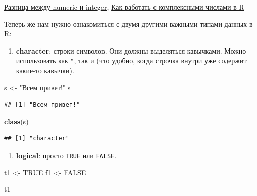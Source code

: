 \documentclass[]{book}
\newenvironment{Shaded}{\begin{snugshade}}{\end{snugshade}}
\newcommand{\KeywordTok}[1]{\textcolor[rgb]{0.13,0.29,0.53}{\textbf{#1}}}
\newcommand{\NormalTok}[1]{#1}
\newcommand{\OtherTok}[1]{\textcolor[rgb]{0.56,0.35,0.01}{#1}}
\newcommand{\StringTok}[1]{\textcolor[rgb]{0.31,0.60,0.02}{#1}}
\providecommand{\tightlist}{%
  \setlength{\itemsep}{0pt}\setlength{\parskip}{0pt}}
\begin{document}
\href{https://stackoverflow.com/questions/23660094/whats-the-difference-between-integer-class-and-numeric-class-in-r}{Разница между numeric и integer}, \href{http://www.r-tutor.com/r-introduction/basic-data-types/complex}{Как работать с комплексными числами в R}

Теперь же нам нужно ознакомиться с двумя другими важными типами данных в R:

\begin{enumerate}
\def\labelenumi{\arabic{enumi}.}
\tightlist
\item
  \textbf{character}: строки символов. Они должны выделяться кавычками. Можно использовать как \texttt{"}, так и \texttt{\textquotesingle{}} (что удобно, когда строчка внутри уже содержит какие-то кавычки).
\end{enumerate}

\begin{Shaded}
\begin{Highlighting}[]
\NormalTok{s <-}\StringTok{ "Всем привет!"}
\NormalTok{s}
\end{Highlighting}
\end{Shaded}

\begin{verbatim}
## [1] "Всем привет!"
\end{verbatim}

\begin{Shaded}
\begin{Highlighting}[]
\KeywordTok{class}\NormalTok{(s)}
\end{Highlighting}
\end{Shaded}

\begin{verbatim}
## [1] "character"
\end{verbatim}

\begin{enumerate}
\def\labelenumi{\arabic{enumi}.}
\setcounter{enumi}{1}
\tightlist
\item
  \textbf{logical}: просто \texttt{TRUE} или \texttt{FALSE}.
\end{enumerate}

\begin{Shaded}
\begin{Highlighting}[]
\NormalTok{t1 <-}\StringTok{ }\OtherTok{TRUE}
\NormalTok{f1 <-}\StringTok{ }\OtherTok{FALSE}

\NormalTok{t1}
\end{Highlighting}
\end{Shaded}
\end{document}
